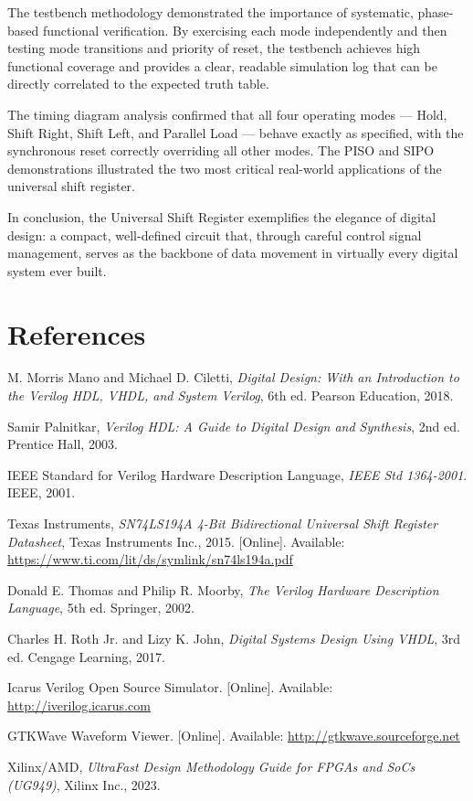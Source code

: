 \documentclass[12pt,a4paper]{report}
\begin{document}
The testbench methodology demonstrated the importance of systematic, phase-based functional verification. By exercising each mode independently and then testing mode transitions and priority of reset, the testbench achieves high functional coverage and provides a clear, readable simulation log that can be directly correlated to the expected truth table.

The timing diagram analysis confirmed that all four operating modes — Hold, Shift Right, Shift Left, and Parallel Load — behave exactly as specified, with the synchronous reset correctly overriding all other modes. The PISO and SIPO demonstrations illustrated the two most critical real-world applications of the universal shift register.

In conclusion, the Universal Shift Register exemplifies the elegance of digital design: a compact, well-defined circuit that, through careful control signal management, serves as the backbone of data movement in virtually every digital system ever built.

\chapter*{References}

\begin{enumerate}[leftmargin=2.5em, label={[\arabic*]}]
    \item M. Morris Mano and Michael D. Ciletti, \textit{Digital Design: With an Introduction to the Verilog HDL, VHDL, and System Verilog}, 6th ed. Pearson Education, 2018.
    \item Samir Palnitkar, \textit{Verilog HDL: A Guide to Digital Design and Synthesis}, 2nd ed. Prentice Hall, 2003.
    \item IEEE Standard for Verilog Hardware Description Language, \textit{IEEE Std 1364-2001}. IEEE, 2001.
    \item Texas Instruments, \textit{SN74LS194A 4-Bit Bidirectional Universal Shift Register Datasheet}, Texas Instruments Inc., 2015. [Online]. Available: \url{https://www.ti.com/lit/ds/symlink/sn74ls194a.pdf}
    \item Donald E. Thomas and Philip R. Moorby, \textit{The Verilog Hardware Description Language}, 5th ed. Springer, 2002.
    \item Charles H. Roth Jr. and Lizy K. John, \textit{Digital Systems Design Using VHDL}, 3rd ed. Cengage Learning, 2017.
    \item Icarus Verilog Open Source Simulator. [Online]. Available: \url{http://iverilog.icarus.com}
    \item GTKWave Waveform Viewer. [Online]. Available: \url{http://gtkwave.sourceforge.net}
    \item Xilinx/AMD, \textit{UltraFast Design Methodology Guide for FPGAs and SoCs (UG949)}, Xilinx Inc., 2023.
\end{enumerate}
\end{document}

